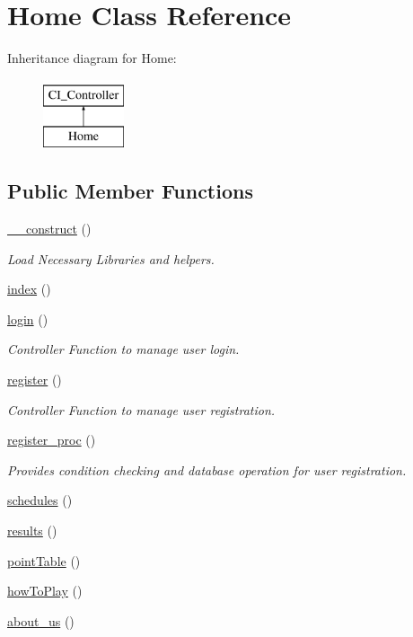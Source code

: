 \hypertarget{class_home}{}\section{Home Class Reference}
\label{class_home}
Inheritance diagram for Home\+:\begin{figure}[H]
\begin{center}
\leavevmode
\includegraphics[height=2.000000cm]{class_home}
\end{center}
\end{figure}
\subsection*{Public Member Functions}
\begin{DoxyCompactItemize}
\item 
\hyperlink{class_home_a095c5d389db211932136b53f25f39685}{\+\_\+\+\_\+construct} ()
\begin{DoxyCompactList}\small\item\em Load Necessary Libraries and helpers. \end{DoxyCompactList}\item 
\hyperlink{class_home_a149eb92716c1084a935e04a8d95f7347}{index} ()
\item 
\hyperlink{class_home_aa311da27ba5706f5710cea7706c8eae1}{login} ()
\begin{DoxyCompactList}\small\item\em Controller Function to manage user login. \end{DoxyCompactList}\item 
\hyperlink{class_home_acc294a6cc8e69743746820e3d15e3f78}{register} ()
\begin{DoxyCompactList}\small\item\em Controller Function to manage user registration. \end{DoxyCompactList}\item 
\hyperlink{class_home_ad326eb22f8413bbdf69ec44c5f91ecd8}{register\+\_\+proc} ()
\begin{DoxyCompactList}\small\item\em Provides condition checking and database operation for user registration. \end{DoxyCompactList}\item 
\hyperlink{class_home_a0b88a3c8868657e7e905b33efccd9803}{schedules} ()
\item 
\hyperlink{class_home_a81532ad36ede4bfc6cd5e69a321f3df4}{results} ()
\item 
\hyperlink{class_home_af8a8d94990b2ac7cf74ed8ad42e79320}{point\+Table} ()
\item 
\hyperlink{class_home_a1792c79aa58f08c367b5fe92e0a3b652}{how\+To\+Play} ()
\item 
\hyperlink{class_home_ad432c4940da698f6df3207bedd4ee7b0}{about\+\_\+us} ()
\end{DoxyCompactItemize}
